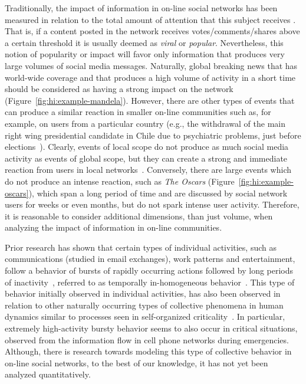 Traditionally, the impact of information in on-line social networks has been
measured in relation to the total amount of attention that this subject receives
\cite{berger2012makes,iribarren2011branching,guerini2011exploring,mills2012virality,gaugaz2012predicting}.
%
That is, if a content posted in the network receives votes/comments/shares above
a certain threshold it is usually deemed as {\em viral} or {\em popular}.
%
Nevertheless, this notion of popularity or impact will favor only information
that produces very large volumes of social media messages. 
%
Naturally, global breaking news that has world-wide coverage and that produces a
high volume of activity in a short time should be considered as having a strong
impact on the network (Figure~\ref{fig:hi:example-mandela}).  
%
However, there are other types of events that can produce a similar reaction in
smaller on-line communities such as, for example, on users from a particular
country (e.g., the withdrawal of the main right wing presidential candidate in
Chile due to psychiatric problems, just before
elections~\cite{chile_elections}). 
%
Clearly, events of local scope do not produce as much social media activity as
events of global scope, but they can create a strong and immediate reaction from
users in local networks~\cite{ReisBOPKA15}. 
%
Conversely, there are large events which do not produce an intense reaction,
such as {\em The Oscars} (Figure~\ref{fig:hi:example-oscars}), which span a long
period of time and are discussed by social network users for weeks or even
months, but do not spark intense user activity. 
%
Therefore, it is reasonable to consider additional dimensions, than just volume,
when analyzing the impact of information in on-line communities.  

Prior research has shown that certain types of individual activities, such as
communications (studied in email exchanges), work patterns and entertainment,
follow a behavior of bursts of rapidly occurring actions followed by long
periods of inactivity~\cite{barabasi2005origin}, referred to as {temporally
in-homogeneous} behavior~\cite{karsai2012universal}.  
%
This type of behavior initially observed in individual activities, has also been
observed in relation to other naturally occurring types of collective phenomena
in human dynamics similar to processes seen in self-organized
criticality~\cite{karsai2012universal}.  
%
In particular, extremely high-activity bursty behavior seems to also occur in
critical situations, observed from the information flow in cell phone networks
during emergencies\cite{gao2014quantifying}.  
%
Although, there is research towards modeling this type of collective behavior
\cite{yan2013information} in on-line social networks, to the best of our
knowledge, it has not yet been analyzed quantitatively.


